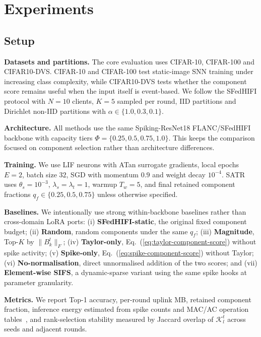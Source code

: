 \documentclass{article} %
\newcommand{\method}{SATR\xspace}
\begin{document}
\section{Experiments}
\label{sec:experiments}

\subsection{Setup}
\label{sec:exp-setup}

\textbf{Datasets and partitions.} The core evaluation uses CIFAR-10, CIFAR-100 and CIFAR10-DVS. CIFAR-10 and CIFAR-100 test static-image SNN training under increasing class complexity, while CIFAR10-DVS tests whether the component score remains useful when the input itself is event-based. We follow the SFedHIFI protocol with $N=10$ clients, $K=5$ sampled per round, IID partitions and Dirichlet non-IID partitions with $\alpha\in\{1.0,0.3,0.1\}$.

\textbf{Architecture.} All methods use the same Spiking-ResNet18 FLANC/SFedHIFI backbone with capacity tiers $\Phi=\{0.25,0.5,0.75,1.0\}$. This keeps the comparison focused on component selection rather than architecture differences.

\textbf{Training.} We use LIF neurons with ATan surrogate gradients, local epochs $E=2$, batch size $32$, SGD with momentum $0.9$ and weight decay $10^{-4}$. \method uses $\theta_s=10^{-3}$, $\lambda_s=\lambda_t=1$, warmup $T_w=5$, and final retained component fractions $q_f\in\{0.25,0.5,0.75\}$ unless otherwise specified.

\textbf{Baselines.} We intentionally use strong within-backbone baselines rather than cross-domain LoRA ports: (i) \textbf{SFedHIFI-static}, the original fixed component budget; (ii) \textbf{Random}, random components under the same $q_f$; (iii) \textbf{Magnitude}, Top-$K$ by $\|B_k^l\|_F$; (iv) \textbf{Taylor-only}, Eq.~(\ref{eq:taylor-component-score}) without spike activity; (v) \textbf{Spike-only}, Eq.~(\ref{eq:spike-component-score}) without Taylor; (vi) \textbf{No-normalisation}, direct unnormalised addition of the two scores; and (vii) \textbf{Element-wise SIFS}, a dynamic-sparse variant using the same spike hooks at parameter granularity.

\textbf{Metrics.} We report Top-1 accuracy, per-round uplink MB, retained component fraction, inference energy estimated from spike counts and MAC/AC operation tables~\citep{horowitz2014energy}, and rank-selection stability measured by Jaccard overlap of $\mathcal{K}_l^t$ across seeds and adjacent rounds.
\end{document}
